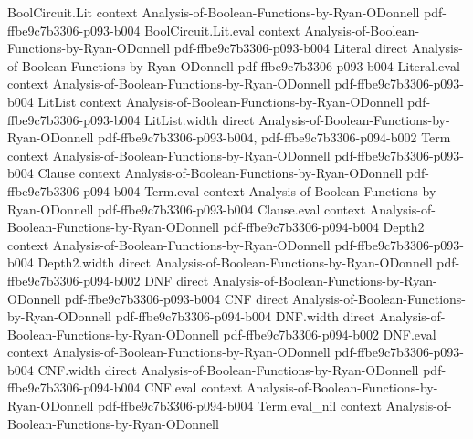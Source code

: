 \begin{lemma}
\label{LowDegreeTest.gowers_product_succ}
\leanok
{}
\proofstep
  {BoolCircuit.Lit}
  {context}
  {Analysis-of-Boolean-Functions-by-Ryan-ODonnell}
  {pdf-ffbe9c7b3306-p093-b004}
\proofstep
  {BoolCircuit.Lit.eval}
  {context}
  {Analysis-of-Boolean-Functions-by-Ryan-ODonnell}
  {pdf-ffbe9c7b3306-p093-b004}
\proofstep
  {Literal}
  {direct}
  {Analysis-of-Boolean-Functions-by-Ryan-ODonnell}
  {pdf-ffbe9c7b3306-p093-b004}
\proofstep
  {Literal.eval}
  {context}
  {Analysis-of-Boolean-Functions-by-Ryan-ODonnell}
  {pdf-ffbe9c7b3306-p093-b004}
\proofstep
  {LitList}
  {context}
  {Analysis-of-Boolean-Functions-by-Ryan-ODonnell}
  {pdf-ffbe9c7b3306-p093-b004}
\proofstep
  {LitList.width}
  {direct}
  {Analysis-of-Boolean-Functions-by-Ryan-ODonnell}
  {pdf-ffbe9c7b3306-p093-b004,
    pdf-ffbe9c7b3306-p094-b002}
\proofstep
  {Term}
  {context}
  {Analysis-of-Boolean-Functions-by-Ryan-ODonnell}
  {pdf-ffbe9c7b3306-p093-b004}
\proofstep
  {Clause}
  {context}
  {Analysis-of-Boolean-Functions-by-Ryan-ODonnell}
  {pdf-ffbe9c7b3306-p094-b004}
\proofstep
  {Term.eval}
  {context}
  {Analysis-of-Boolean-Functions-by-Ryan-ODonnell}
  {pdf-ffbe9c7b3306-p093-b004}
\proofstep
  {Clause.eval}
  {context}
  {Analysis-of-Boolean-Functions-by-Ryan-ODonnell}
  {pdf-ffbe9c7b3306-p094-b004}
\proofstep
  {Depth2}
  {context}
  {Analysis-of-Boolean-Functions-by-Ryan-ODonnell}
  {pdf-ffbe9c7b3306-p093-b004}
\proofstep
  {Depth2.width}
  {direct}
  {Analysis-of-Boolean-Functions-by-Ryan-ODonnell}
  {pdf-ffbe9c7b3306-p094-b002}
\proofstep
  {DNF}
  {direct}
  {Analysis-of-Boolean-Functions-by-Ryan-ODonnell}
  {pdf-ffbe9c7b3306-p093-b004}
\proofstep
  {CNF}
  {direct}
  {Analysis-of-Boolean-Functions-by-Ryan-ODonnell}
  {pdf-ffbe9c7b3306-p094-b004}
\proofstep
  {DNF.width}
  {direct}
  {Analysis-of-Boolean-Functions-by-Ryan-ODonnell}
  {pdf-ffbe9c7b3306-p094-b002}
\proofstep
  {DNF.eval}
  {context}
  {Analysis-of-Boolean-Functions-by-Ryan-ODonnell}
  {pdf-ffbe9c7b3306-p093-b004}
\proofstep
  {CNF.width}
  {direct}
  {Analysis-of-Boolean-Functions-by-Ryan-ODonnell}
  {pdf-ffbe9c7b3306-p094-b004}
\proofstep
  {CNF.eval}
  {context}
  {Analysis-of-Boolean-Functions-by-Ryan-ODonnell}
  {pdf-ffbe9c7b3306-p094-b004}
\proofstep
  {Term.eval_nil}
  {context}
  {Analysis-of-Boolean-Functions-by-Ryan-ODonnell}

\end{lemma}
